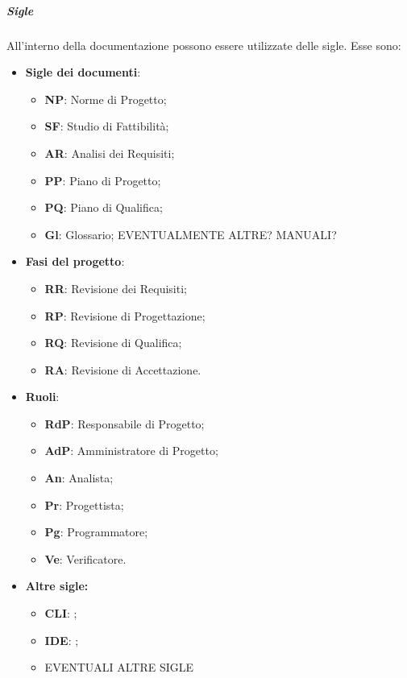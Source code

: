 \documentclass[../norme-di-progetto.tex]{subfiles}
\begin{document}
\subparagraph{Sigle}
All'interno della documentazione possono essere utilizzate delle sigle. Esse sono:
\begin{itemize}
  \item \textbf{Sigle dei documenti}:
  \begin{itemize}
    \item \textbf{NP}: Norme di Progetto;
    \item \textbf{SF}: Studio di Fattibilità;
    \item \textbf{AR}: Analisi dei Requisiti;
    \item \textbf{PP}: Piano di Progetto;
    \item \textbf{PQ}: Piano di Qualifica;
    \item \textbf{Gl}: Glossario;
    EVENTUALMENTE ALTRE? MANUALI?
  \end{itemize}
  \item \textbf{Fasi del progetto}:
  \begin{itemize}
  \item \textbf{RR}: Revisione dei Requisiti;
  \item \textbf{RP}: Revisione di Progettazione;
  \item \textbf{RQ}: Revisione di Qualifica;
  \item \textbf{RA}: Revisione di Accettazione.
  \end{itemize}
  \item \textbf{Ruoli}:
  \begin{itemize}
  \item \textbf{RdP}: Responsabile di Progetto;
  \item \textbf{AdP}: Amministratore di Progetto;
  \item \textbf{An}: Analista;
  \item \textbf{Pr}: Progettista;
  \item \textbf{Pg}: Programmatore;
  \item \textbf{Ve}: Verificatore.
  \end{itemize}
  \item \textbf{Altre sigle:}
  \begin{itemize}
    \item \textbf{CLI}: ;
    \item \textbf{IDE}: ;
    \item EVENTUALI ALTRE SIGLE
  \end{itemize}
\end{itemize}
\end{document}
